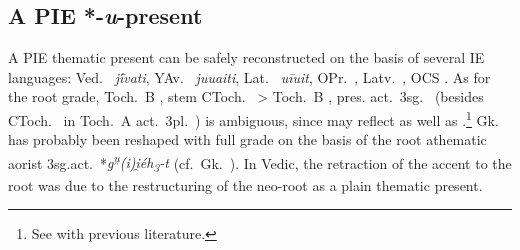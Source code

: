 \documentclass[output=paper,colorlinks,citecolor=brown]{langscibook}
\begin{document}
\subsection{A PIE *-\emph{u}-present}  


A PIE thematic present can be safely reconstructed on the basis of several IE languages: Ved.\  \textit{jī́vati}, YAv.\   \textit{juuaiti}, Lat.\    \textit{uīuit}, OPr.\ , Latv.\ , OCS . As for the root grade, Toch.\ B , stem CToch.\  > Toch.\ B , pres. act.\ 3sg.\  (besides CToch.\  in Toch.\ A act.\ 3pl.\ ) is ambiguous, since  may reflect  as well as .\footnote{See \citealt[916--919]{Malzahn2010} with previous literature.} Gk.\   has probably been reshaped with full grade on the basis of the root athematic aorist 3sg.act.\ *\textit{g\textsuperscript{u̯}(i)i̯éh\textsubscript{3}-t} (cf.\  Gk.\  ). In Vedic, the retraction of the accent to the root was due to the restructuring of the neo-root  as a plain thematic present. 
\end{document}
